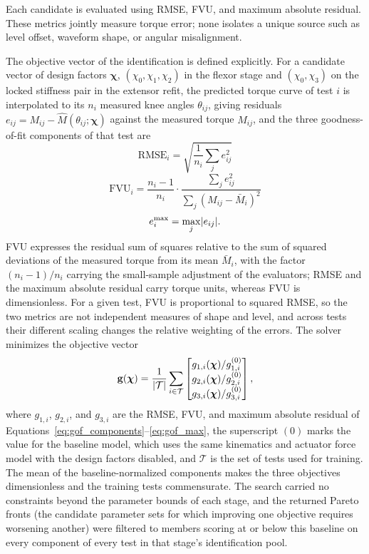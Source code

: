 Each candidate is evaluated using RMSE, FVU, and maximum absolute residual. These metrics jointly measure torque error; none isolates a unique source such as level offset, waveform shape, or angular misalignment.

The objective vector of the identification is defined explicitly. For a candidate vector of design factors $\boldsymbol{\chi}$, $(\chi_{0}, \chi_{1}, \chi_{2})$ in the flexor stage and $(\chi_{0}, \chi_{3})$ on the locked stiffness pair in the extensor refit, the predicted torque curve of test $i$ is interpolated to its $n_{i}$ measured knee angles $\theta_{ij}$, giving residuals $e_{ij} = M_{ij} - \hat{M}(\theta_{ij}; \boldsymbol{\chi})$ against the measured torque $M_{ij}$, and the three goodness-of-fit components of that test are
\begin{equation}
\mathrm{RMSE}_{i} = \sqrt{\frac{1}{n_{i}}\sum_{j} e_{ij}^{2}}\label{eq:gof_components}
\end{equation}
\begin{equation}
\mathrm{FVU}_{i} = \frac{n_{i}-1}{n_{i}} \cdot \frac{\sum_{j} e_{ij}^{2}}{\sum_{j} (M_{ij} - \bar{M}_{i})^{2}}\label{eq:gof_fvu}
\end{equation}
\begin{equation}
e^{\max}_{i} = \max_{j} \lvert e_{ij}\rvert.\label{eq:gof_max}
\end{equation}
FVU expresses the residual sum of squares relative to the sum of squared deviations of the measured torque from its mean $\bar{M}_{i}$, with the factor $(n_{i}-1)/n_{i}$ carrying the small-sample adjustment of the evaluators; RMSE and the maximum absolute residual carry torque units, whereas FVU is dimensionless. For a given test, FVU is proportional to squared RMSE, so the two metrics are not independent measures of shape and level, and across tests their different scaling changes the relative weighting of the errors. The solver minimizes the objective vector
\begin{equation}
\mathbf{g}(\boldsymbol{\chi}) = \frac{1}{\lvert\mathcal{T}\rvert} \sum_{i \in \mathcal{T}}
\begin{bmatrix}
g_{1,i}(\boldsymbol{\chi})/g_{1,i}^{(0)} \\
g_{2,i}(\boldsymbol{\chi})/g_{2,i}^{(0)} \\
g_{3,i}(\boldsymbol{\chi})/g_{3,i}^{(0)}
\end{bmatrix},
\label{eq:gof_objective}
\end{equation}
where $g_{1,i}$, $g_{2,i}$, and $g_{3,i}$ are the RMSE, FVU, and maximum absolute residual of Equations~\eqref{eq:gof_components}--\eqref{eq:gof_max}, the superscript $(0)$ marks the value for the baseline model, which uses the same kinematics and actuator force model with the design factors disabled, and $\mathcal{T}$ is the set of tests used for training. The mean of the baseline-normalized components makes the three objectives dimensionless and the training tests commensurate. The search carried no constraints beyond the parameter bounds of each stage, and the returned Pareto fronts (the candidate parameter sets for which improving one objective requires worsening another) were filtered to members scoring at or below this baseline on every component of every test in that stage's identification pool.

